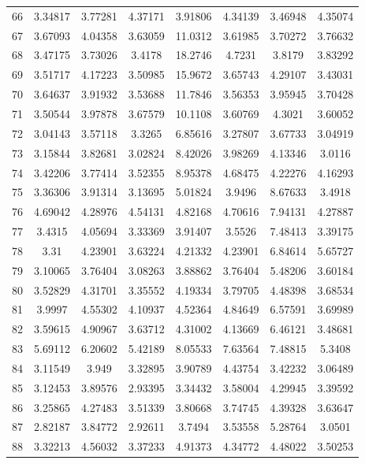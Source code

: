 \begin{center}
\begin{longtable}{cccccccc}
66 & 3.34817 & 3.77281 & 4.37171 & 3.91806 & 4.34139 & 3.46948 & 4.35074\\
67 & 3.67093 & 4.04358 & 3.63059 & 11.0312 & 3.61985 & 3.70272 & 3.76632\\
68 & 3.47175 & 3.73026 & 3.4178 & 18.2746 & 4.7231 & 3.8179 & 3.83292\\
69 & 3.51717 & 4.17223 & 3.50985 & 15.9672 & 3.65743 & 4.29107 & 3.43031\\
70 & 3.64637 & 3.91932 & 3.53688 & 11.7846 & 3.56353 & 3.95945 & 3.70428\\
71 & 3.50544 & 3.97878 & 3.67579 & 10.1108 & 3.60769 & 4.3021 & 3.60052\\
72 & 3.04143 & 3.57118 & 3.3265 & 6.85616 & 3.27807 & 3.67733 & 3.04919\\
73 & 3.15844 & 3.82681 & 3.02824 & 8.42026 & 3.98269 & 4.13346 & 3.0116\\
74 & 3.42206 & 3.77414 & 3.52355 & 8.95378 & 4.68475 & 4.22276 & 4.16293\\
75 & 3.36306 & 3.91314 & 3.13695 & 5.01824 & 3.9496 & 8.67633 & 3.4918\\
76 & 4.69042 & 4.28976 & 4.54131 & 4.82168 & 4.70616 & 7.94131 & 4.27887\\
77 & 3.4315 & 4.05694 & 3.33369 & 3.91407 & 3.5526 & 7.48413 & 3.39175\\
78 & 3.31 & 4.23901 & 3.63224 & 4.21332 & 4.23901 & 6.84614 & 5.65727\\
79 & 3.10065 & 3.76404 & 3.08263 & 3.88862 & 3.76404 & 5.48206 & 3.60184\\
80 & 3.52829 & 4.31701 & 3.35552 & 4.19334 & 3.79705 & 4.48398 & 3.68534\\
81 & 3.9997 & 4.55302 & 4.10937 & 4.52364 & 4.84649 & 6.57591 & 3.69989\\
82 & 3.59615 & 4.90967 & 3.63712 & 4.31002 & 4.13669 & 6.46121 & 3.48681\\
83 & 5.69112 & 6.20602 & 5.42189 & 8.05533 & 7.63564 & 7.48815 & 5.3408\\
84 & 3.11549 & 3.949 & 3.32895 & 3.90789 & 4.43754 & 3.42232 & 3.06489\\
85 & 3.12453 & 3.89576 & 2.93395 & 3.34432 & 3.58004 & 4.29945 & 3.39592\\
86 & 3.25865 & 4.27483 & 3.51339 & 3.80668 & 3.74745 & 4.39328 & 3.63647\\
87 & 2.82187 & 3.84772 & 2.92611 & 3.7494 & 3.53558 & 5.28764 & 3.0501\\
88 & 3.32213 & 4.56032 & 3.37233 & 4.91373 & 4.34772 & 4.48022 & 3.50253\\

\end{longtable}
\end{center}
